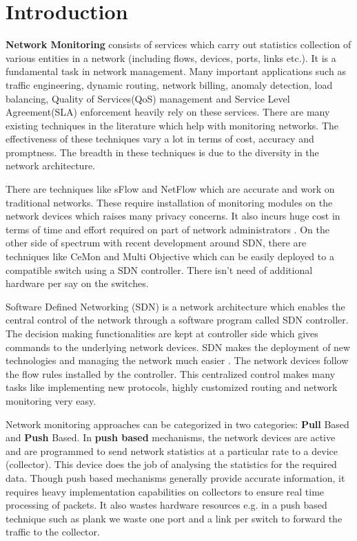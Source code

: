 \section{Introduction}
\label{introduction}
\textbf{Network Monitoring} consists of services which carry out statistics collection of various entities in a network (including flows, devices, ports, links etc.). It is a fundamental task in network management.
Many important applications such as traffic engineering, dynamic routing, network billing, anomaly detection, load balancing, Quality of Services(QoS) management and Service Level Agreement(SLA) enforcement heavily rely on these services.
There are many existing techniques in the literature which help with monitoring networks. The effectiveness of these techniques vary a lot in terms of cost, accuracy and promptness. The breadth in these techniques is due to the diversity in the network architecture.

There are techniques like sFlow \cite{sflow} and NetFlow \cite{netflow} which are accurate and work on traditional networks. These require installation of monitoring modules on the network devices which raises many privacy concerns. It also incurs huge cost in terms of time and effort required on part of network administrators \cite{opensketch}. 
On the other side of spectrum with recent development around SDN, there are techniques like CeMon\cite{CEMON} and Multi Objective which can be easily deployed to a compatible switch using a SDN controller. There isn't need of additional hardware per say on the switches.

Software Defined Networking (SDN) is a network architecture which enables the central control of the network through a software program called SDN controller. The decision making functionalities are kept at controller side which gives commands to the underlying network devices. SDN makes the deployment of new technologies and managing the network much easier \cite{improving}. The network devices follow the flow rules installed by the controller. This centralized control makes many tasks like implementing new protocols, highly customized routing and network monitoring very easy.

Network monitoring approaches can be categorized in two categories: \textbf{Pull} Based and \textbf{Push} Based.
In \textbf{push based} mechanisms, the network devices are active and are programmed to send network statistics at a particular rate to a device (collector). This device does the job of analysing the statistics for the required data. Though push based mechanisms generally provide accurate information, it requires heavy implementation capabilities on collectors to ensure real time processing of packets. It also wastes hardware resources e.g. in a push based technique such as plank \cite{plank} we waste one port and a link per switch to forward the traffic to the collector. 


